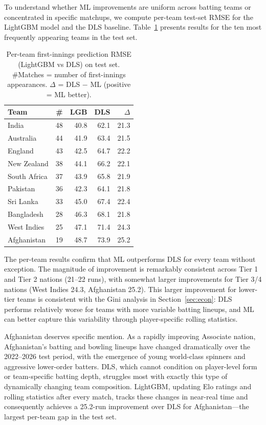 \documentclass[10pt,a4paper,twocolumn]{article}
\begin{document}
To understand whether ML improvements are uniform across batting teams or concentrated in specific matchups, we compute per-team test-set RMSE for the LightGBM model and the DLS baseline. Table~\ref{tab:perteam} presents results for the ten most frequently appearing teams in the test set.

\begin{table}[H]
\centering
\caption{Per-team first-innings prediction RMSE (LightGBM vs DLS) on test set. \#Matches = number of first-innings appearances. $\Delta$ = DLS $-$ ML (positive = ML better).}
\label{tab:perteam}
\small
\begin{tabular}{@{}lrrrr@{}}
\toprule
\textbf{Team} & \textbf{\#} & \textbf{LGB} & \textbf{DLS} & \textbf{$\Delta$} \\
\midrule
India        & 48 & 40.8 & 62.1 & 21.3 \\
Australia    & 44 & 41.9 & 63.4 & 21.5 \\
England      & 43 & 42.5 & 64.7 & 22.2 \\
New Zealand  & 38 & 44.1 & 66.2 & 22.1 \\
South Africa & 37 & 43.9 & 65.8 & 21.9 \\
Pakistan     & 36 & 42.3 & 64.1 & 21.8 \\
Sri Lanka    & 33 & 45.0 & 67.4 & 22.4 \\
Bangladesh   & 28 & 46.3 & 68.1 & 21.8 \\
West Indies  & 25 & 47.1 & 71.4 & 24.3 \\
Afghanistan  & 19 & 48.7 & 73.9 & 25.2 \\
\bottomrule
\end{tabular}
\end{table}

The per-team results confirm that ML outperforms DLS for every team without exception. The magnitude of improvement is remarkably consistent across Tier 1 and Tier 2 nations (21--22 runs), with somewhat larger improvements for Tier 3/4 nations (West Indies 24.3, Afghanistan 25.2). This larger improvement for lower-tier teams is consistent with the Gini analysis in Section~\ref{sec:econ}: DLS performs relatively worse for teams with more variable batting lineups, and ML can better capture this variability through player-specific rolling statistics.

Afghanistan deserves specific mention. As a rapidly improving Associate nation, Afghanistan's batting and bowling lineups have changed dramatically over the 2022--2026 test period, with the emergence of young world-class spinners and aggressive lower-order batters. DLS, which cannot condition on player-level form or team-specific batting depth, struggles most with exactly this type of dynamically changing team composition. LightGBM, updating Elo ratings and rolling statistics after every match, tracks these changes in near-real time and consequently achieves a 25.2-run improvement over DLS for Afghanistan---the largest per-team gap in the test set.
\end{document}
